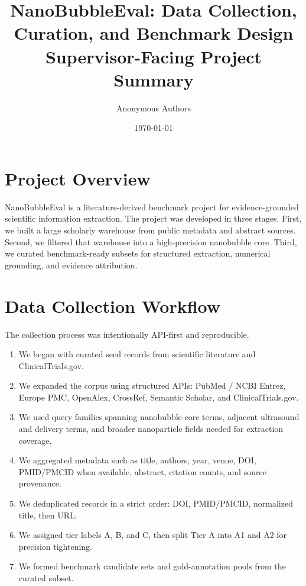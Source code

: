 \documentclass[11pt]{article}
\title{\textbf{NanoBubbleEval: Data Collection, Curation, and Benchmark Design}\\
\large Supervisor-Facing Project Summary}
\author{Anonymous Authors}
\date{\today}
\begin{document}
\maketitle

\section*{Project Overview}
NanoBubbleEval is a literature-derived benchmark project for evidence-grounded scientific information extraction. The project was developed in three stages. First, we built a large scholarly warehouse from public metadata and abstract sources. Second, we filtered that warehouse into a high-precision nanobubble core. Third, we curated benchmark-ready subsets for structured extraction, numerical grounding, and evidence attribution.

\section*{Data Collection Workflow}
The collection process was intentionally API-first and reproducible.
\begin{enumerate}[leftmargin=1.7em]
    \item We began with curated seed records from scientific literature and ClinicalTrials.gov.
    \item We expanded the corpus using structured APIs: PubMed / NCBI Entrez, Europe PMC, OpenAlex, CrossRef, Semantic Scholar, and ClinicalTrials.gov.
    \item We used query families spanning nanobubble-core terms, adjacent ultrasound and delivery terms, and broader nanoparticle fields needed for extraction coverage.
    \item We aggregated metadata such as title, authors, year, venue, DOI, PMID/PMCID when available, abstract, citation counts, and source provenance.
    \item We deduplicated records in a strict order: DOI, PMID/PMCID, normalized title, then URL.
    \item We assigned tier labels A, B, and C, then split Tier A into A1 and A2 for precision tightening.
    \item We formed benchmark candidate sets and gold-annotation pools from the curated subset.
\end{enumerate}
\end{document}
